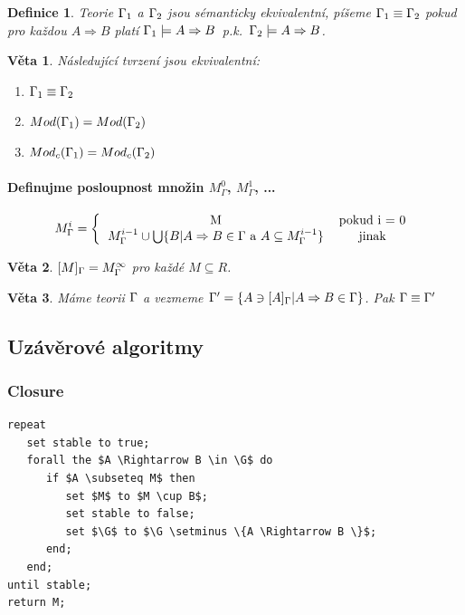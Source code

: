 \documentclass[10pt,a4paper]{article}
\newtheorem{veta}{Věta}
\newtheorem{definition}{Definice}
\begin{document}
\begin{definition}
Teorie $\Gamma_1$ a $\Gamma_2$ jsou \emph{sémanticky ekvivalentní}, píšeme $\Gamma_1 \equiv \Gamma_2$ pokud pro každou $A \Rightarrow B$ platí $\Gamma_1 \models A \Rightarrow B$~p.k.~$\Gamma_2 \models A \Rightarrow B$.
\end{definition}

\begin{veta}
\label{veta:ekvivMod}
Následující tvrzení jsou ekvivalentní:
\begin{enumerate}[i]
\item $\Gamma_1 \equiv \Gamma_2$
\item $Mod(\Gamma_1) = Mod(\Gamma_2)$
\item $Mod_c(\Gamma_1) = Mod_c(\Gamma_2)$
\end{enumerate}
\end{veta}

\paragraph{Definujme posloupnost množin $M_\Gamma^0$, $M_\Gamma^1$, ...\\}
\[ 
M_\G^i =
\left \{
  \begin{tabular}{cc}
  M & pokud i = 0  \\
  $$$M_\G^{i-1} \cup \bigcup \{B|A \Rightarrow B \in \G$ a $A \subseteq M_\G^{i-1} \}$$$ & jinak
  \end{tabular}
\right. 
\]

\begin{veta}
$[M]_\Gamma = M_\Gamma^\infty$ pro každé $M \subseteq R$.
\end{veta}

\begin{veta}
Máme teorii $\Gamma$ a vezmeme $\Gamma' = \{A \ni [A]_\Gamma | A \Rightarrow B \in \Gamma \}$. Pak $\Gamma \equiv \Gamma'$
\end{veta}

\subsection{Uzávěrové algoritmy}
\subsubsection{Closure}
\begin{lstlisting}
repeat
   set stable to true;
   forall the $A \Rightarrow B \in \G$ do
      if $A \subseteq M$ then
         set $M$ to $M \cup B$;
         set stable to false;
         set $\G$ to $\G \setminus \{A \Rightarrow B \}$;
      end;
   end;
until stable;
return M;
\end{lstlisting}
\end{document}
